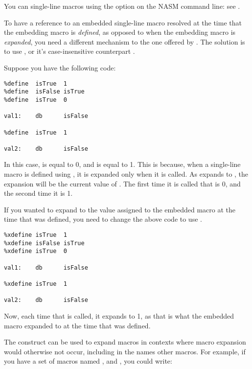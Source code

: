 You can  single-line macros using the 
option on the NASM command line: see .


To have a reference to an embedded single-line macro resolved at the
time that the embedding macro is \emph{defined}, as opposed to when the
embedding macro is \emph{expanded}, you need a different mechanism to the
one offered by . The solution is to use , or
it's case-insensitive counterpart .

Suppose you have the following code:

\begin{lstlisting}
%define  isTrue  1
%define  isFalse isTrue
%define  isTrue  0

val1:    db      isFalse

%define  isTrue  1

val2:    db      isFalse
\end{lstlisting}

In this case,  is equal to 0, and  is equal to 1.
This is because, when a single-line macro is defined using ,
it is expanded only when it is called. As  expands to ,
the expansion will be the current value of . The first time it is called
that is 0, and the second time it is 1.

If you wanted  to expand to the value assigned to the
embedded macro  at the time that  was defined,
you need to change the above code to use .

\begin{lstlisting}
%xdefine isTrue  1
%xdefine isFalse isTrue
%xdefine isTrue  0

val1:    db      isFalse

%xdefine isTrue  1

val2:    db      isFalse
\end{lstlisting}

Now, each time that  is called, it expands to 1,
as that is what the embedded macro  expanded to at
the time that  was defined.

\xsubsection{indmacro}{\textindexlc{Macro Indirection}: \indexcode{\%[}\code{\%[...]}}

The \code{\%[...]} construct can be used to expand macros in contexts
where macro expansion would otherwise not occur, including in the
names other macros. For example, if you have a set of macros named
,  and , you could write:

